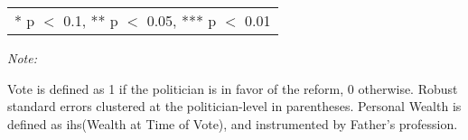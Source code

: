 \begin{table}[!h]
{\begin{threeparttable}
\begin{tabular}[t]{lcccccc}
\bottomrule
\multicolumn{7}{l}{\rule{0pt}{1em}* p $<$ 0.1, ** p $<$ 0.05, *** p $<$ 0.01}\\
\end{tabular}
\begin{tablenotes}[para]
\item \textit{Note: } 
\item Vote is defined as 1 if the politician is in favor of the reform, 0 otherwise. Robust standard errors clustered at the politician-level in parentheses. Personal Wealth is defined as ihs(Wealth at Time of Vote), and instrumented by Father's profession.
\end{tablenotes}
\end{threeparttable}}
\end{table}
